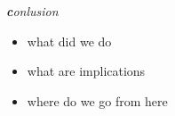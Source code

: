 \textbf{\emph{c}}\emph{onlusion} 
\begin{itemize}
\item what did we do 
\item what are implications 
\item where do we go from here 
\end{itemize}

